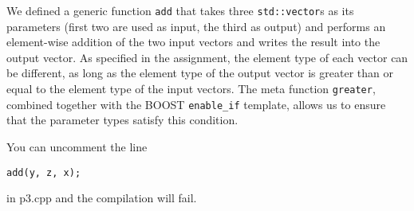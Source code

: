 \documentclass[12pt,a4paper]{article}
\begin{document}
We defined a generic function \texttt{add} that takes three \texttt{std::vector}s as its parameters (first two are used as input, the third as output) and performs an element-wise addition of the two input vectors and writes the result into the output vector.
As specified in the assignment, the element type of each vector can be different, as long as the element type of the output vector is greater than or equal to the element type of the input vectors.
The meta function \texttt{greater}, combined together with the BOOST \texttt{enable\_if} template, allows us to ensure that the parameter types satisfy this condition.

You can uncomment the line 
\begin{verbatim}
add(y, z, x);
\end{verbatim}
in p3.cpp and the compilation will fail.
\end{document}
